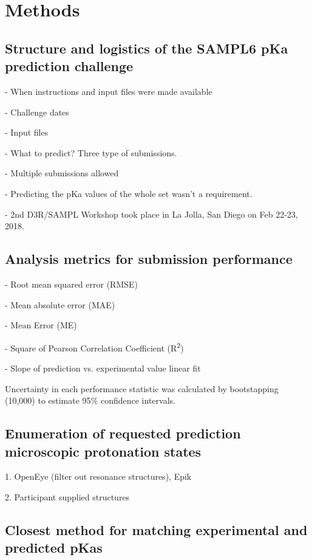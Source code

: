 \documentclass[9pt,lineno]{elife}
\begin{document}
\section{Methods}

\subsection{Structure and logistics of the SAMPL6 pKa prediction challenge}
- When instructions and input files were made available

- Challenge dates

- Input files

- What to predict? Three type of submissions.

- Multiple submissions allowed

- Predicting the pKa values of the whole set wasn't a requirement. 

- 2nd D3R/SAMPL Workshop took place in La Jolla, San Diego on Feb 22-23, 2018.

\subsection{Analysis metrics for submission performance}
- Root mean squared error (RMSE)

- Mean absolute error (MAE)

- Mean Error (ME)

- Square of Pearson Correlation Coefficient (R\textsuperscript{2})

- Slope of prediction vs. experimental value linear fit

Uncertainty in each performance statistic was calculated by bootstapping (10,000) to estimate 95\% confidence intervals.

\subsection{Enumeration of requested prediction microscopic protonation states}
1. OpenEye (filter out resonance structures), Epik  

2. Participant supplied structures  

\subsection{Closest method for matching experimental and predicted pKas}
\end{document}
